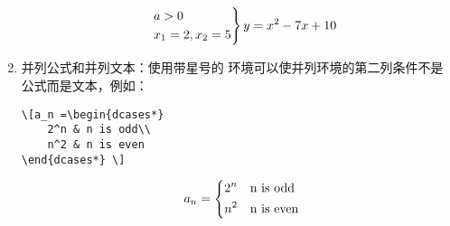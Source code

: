 \begin{enumerate}
\begin{tcolorbox}[sidebyside]
\tcblower

\[\quad\begin{rcases}
    a > 0 \\
    x_1=2,x_2=5
\end{rcases} 
y=x^2-7x+10 \]
\end{tcolorbox}
 
\item 并列公式和并列文本：使用带星号的  环境可以使并列环境的第二列条件不是公式而是文本，例如：

\begin{tcolorbox}[sidebyside]
\begin{lstlisting}
\[a_n =\begin{dcases*} 
    2^n & n is odd\\
    n^2 & n is even
\end{dcases*} \]
\end{lstlisting} 

\tcblower

\[\quad a_n=\begin{dcases*} 
    2^n & n is odd\\
    n^2 & n is even
  \end{dcases*} \]
\end{tcolorbox}


\end{enumerate}
